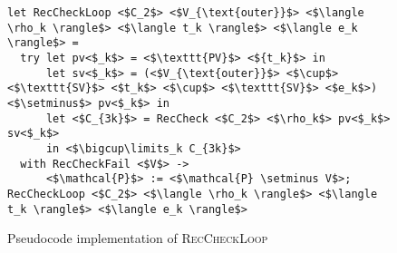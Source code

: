 \begin{figure}
\centering
\small

\begin{verbatim}
let RecCheckLoop <$C_2$> <$V_{\text{outer}}$> <$\langle \rho_k \rangle$> <$\langle t_k \rangle$> <$\langle e_k \rangle$> =
  try let pv<$_k$> = <$\texttt{PV}$> <${t_k}$> in
      let sv<$_k$> = (<$V_{\text{outer}}$> <$\cup$> <$\texttt{SV}$> <$t_k$> <$\cup$> <$\texttt{SV}$> <$e_k$>) <$\setminus$> pv<$_k$> in
      let <$C_{3k}$> = RecCheck <$C_2$> <$\rho_k$> pv<$_k$> sv<$_k$>
      in <$\bigcup\limits_k C_{3k}$>
  with RecCheckFail <$V$> ->
      <$\mathcal{P}$> := <$\mathcal{P} \setminus V$>; RecCheckLoop <$C_2$> <$\langle \rho_k \rangle$> <$\langle t_k \rangle$> <$\langle e_k \rangle$>
\end{verbatim}

\caption{Pseudocode implementation of \textsc{RecCheckLoop}}
\label{fig:helpers}
\end{figure}